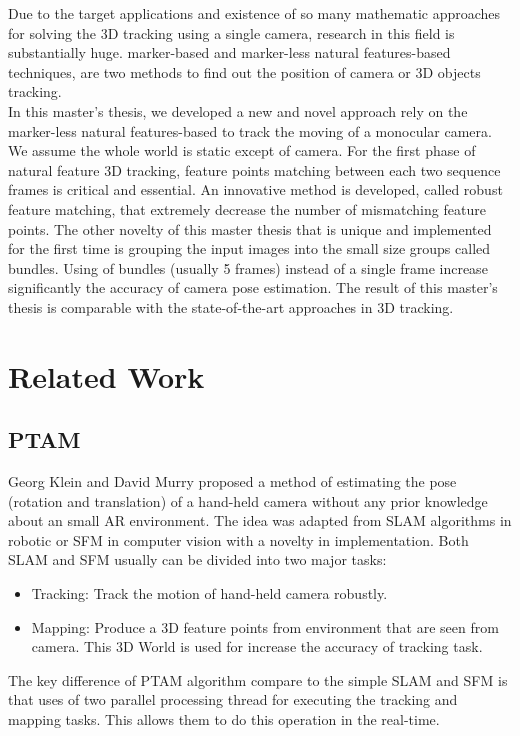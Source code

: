 Due to the target applications and existence of so many mathematic approaches for solving the 3D tracking using a single camera, research in this field is substantially huge. marker-based and marker-less natural features-based techniques, are two methods to find out the position of camera or 3D objects tracking.\\
In this master's thesis, we developed a new and novel approach rely on the marker-less natural features-based to track the moving of a monocular camera. We assume the whole world is static except of camera. For the first phase of natural feature 3D tracking, feature points matching between each two sequence frames is critical and essential. An innovative method is developed, called robust feature matching, that extremely decrease the number of mismatching feature points. The other novelty of this master thesis that is unique and implemented for the first time is grouping the input images into the small size groups called bundles. Using of bundles (usually 5 frames) instead of a single frame increase significantly the accuracy of camera pose estimation. The result of this master's thesis is comparable with the state-of-the-art approaches in 3D tracking.\\

\section{Related Work}
\subsection{PTAM}
Georg Klein and David Murry \cite{klein2007parallel} proposed a method of estimating the pose (rotation and translation) of a hand-held camera without any prior knowledge about an small AR environment. The idea was adapted from SLAM algorithms in robotic or SFM in computer vision with a novelty in implementation. Both SLAM and SFM usually can be divided into two major tasks:
\begin{itemize}
\item Tracking: Track the motion of hand-held camera robustly.
\item Mapping: Produce a 3D feature points from environment that are seen from camera. This 3D World is used for increase the accuracy of tracking task.
\end{itemize}
The key difference of PTAM algorithm compare to the simple SLAM and SFM is that uses of two parallel processing thread for executing the tracking and mapping tasks. This allows them to do this operation in the real-time.\\

